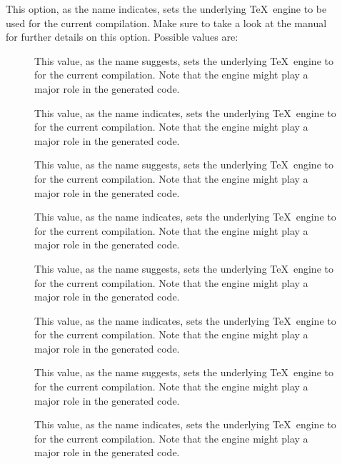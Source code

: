 \begin{description}
\begin{description}
\item[] This option, as the name indicates, sets the underlying \TeX\ engine to be used for the current compilation. Make sure to take a look at the manual for further details on this option. Possible values are:

\begin{description}
\item[] This value, as the name suggests, sets the underlying \TeX\ engine to  for the current compilation. Note that the engine might play a major role in the generated code.

\item[] This value, as the name indicates, sets the underlying \TeX\ engine to  for the current compilation. Note that the engine might play a major role in the generated code.

\item[] This value, as the name suggests, sets the underlying \TeX\ engine to  for the current compilation. Note that the engine might play a major role in the generated code.

\item[] This value, as the name indicates, sets the underlying \TeX\ engine to  for the current compilation. Note that the engine might play a major role in the generated code.

\item[] This value, as the name suggests, sets the underlying \TeX\ engine to  for the current compilation. Note that the engine might play a major role in the generated code.

\item[] This value, as the name indicates, sets the underlying \TeX\ engine to  for the current compilation. Note that the engine might play a major role in the generated code.

\item[] This value, as the name suggests, sets the underlying \TeX\ engine to  for the current compilation. Note that the engine might play a major role in the generated code.

\item[] This value, as the name indicates, sets the underlying \TeX\ engine to  for the current compilation. Note that the engine might play a major role in the generated code.
\end{description}


\end{description}
\end{description}
